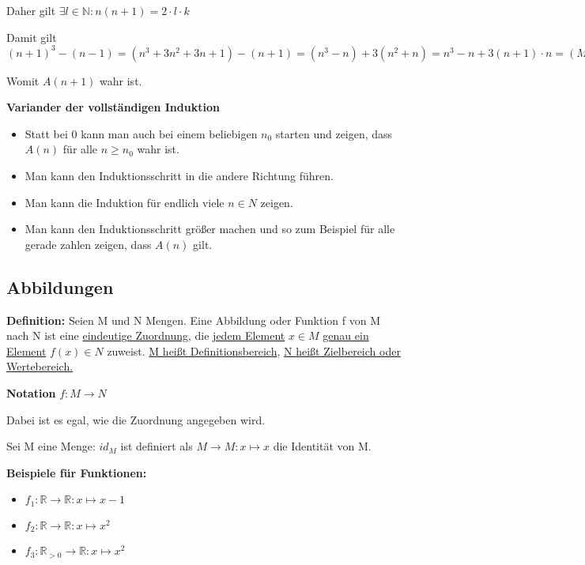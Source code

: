 \documentclass[pdftex,12pt,a4paper,fleqn]{scrartcl}
\begin{document}
Daher gilt $\exists l \in \mathbb{N}: n(n+1)=2 \cdot l \cdot k$

Damit gilt $(n+1)^3-(n-1) = (n^3 + 3n^2 + 3n +1) - (n + 1) = (n^3 -n) + 3(n^2+n)=n^3-n+3(n+1)\cdot n = (Mit\ Induktionsannahme) 6k+3(n+1)\cdot n = 6k + 3 \cdot 2 \cdot l = 6(k+l)$

Womit $A(n+1)$ wahr ist.

\textbf{Variander der vollständigen Induktion}
\begin{itemize}
    \item Statt bei 0 kann man auch bei einem beliebigen $n_0$ starten und zeigen, dass $A(n) $ für alle $n \geq n_0$ wahr ist.
    \item Man kann den Induktionsschritt in die andere Richtung führen.
    \item Man kann die Induktion für endlich viele $n \in N$ zeigen.
    \item Man kann den Induktionsschritt größer machen und so zum Beispiel für alle gerade zahlen zeigen, dass $A(n)$ gilt. 
\end{itemize}



\subsection{Abbildungen} %
\label{sub:abbildungen}

\textbf{Definition:} Seien M und N Mengen. Eine Abbildung oder Funktion f von M nach N ist eine \underline{eindeutige Zuordnung}, die \underline{jedem Element} $x \in M$ \underline{genau ein Element} $f(x) \in N$ zuweist. \underline{M heißt Definitionsbereich}, \underline{N heißt Zielbereich oder Wertebereich.}

\textbf{Notation} $f: M \rightarrow N$

Dabei ist es egal, wie die Zuordnung angegeben wird.

Sei M eine Menge: $id_M$ ist definiert als $ M \rightarrow M: x \mapsto x$ die Identität von M.

\textbf{Beispiele für Funktionen:}
\begin{itemize}
    \item $f_1: \mathbb{R} \rightarrow \mathbb{R}: x \mapsto x-1$
    \item $f_2: \mathbb{R} \rightarrow \mathbb{R}: x \mapsto x^2$
    \item $f_3: \mathbb{R}_{>0} \rightarrow \mathbb{R}: x \mapsto x^2$
\end{itemize}
\end{document}
